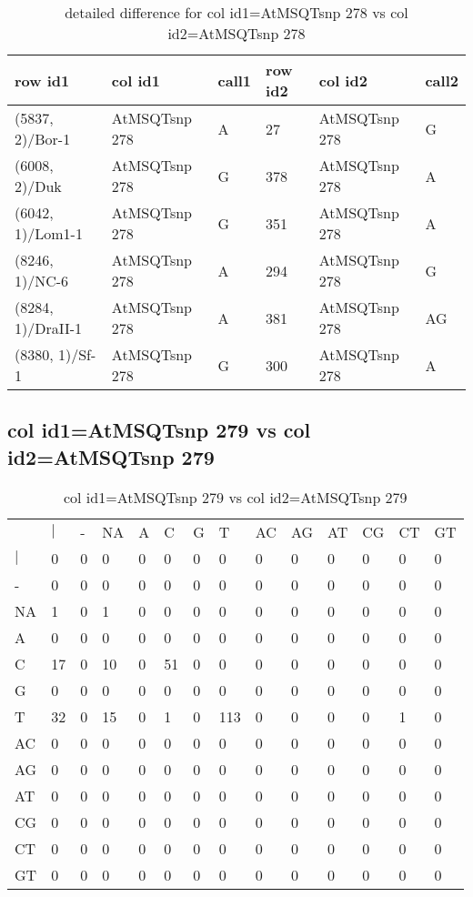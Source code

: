 \begin{center}
\begin{longtable}{|l|l|l|l|l|l|}
\caption{detailed difference for col id1=AtMSQTsnp 278 vs col id2=AtMSQTsnp 278} \label{table_dm617}\\
\hline
row id1&col id1&call1&row id2&col id2&call2\\
\hline
(5837, 2)/Bor-1&AtMSQTsnp 278&A&27&AtMSQTsnp 278&G\\
(6008, 2)/Duk&AtMSQTsnp 278&G&378&AtMSQTsnp 278&A\\
(6042, 1)/Lom1-1&AtMSQTsnp 278&G&351&AtMSQTsnp 278&A\\
(8246, 1)/NC-6&AtMSQTsnp 278&A&294&AtMSQTsnp 278&G\\
(8284, 1)/DraII-1&AtMSQTsnp 278&A&381&AtMSQTsnp 278&AG\\
(8380, 1)/Sf-1&AtMSQTsnp 278&G&300&AtMSQTsnp 278&A\\
\hline
\end{longtable}
\end{center}

\subsection{col id1=AtMSQTsnp 279 vs col id2=AtMSQTsnp 279}
\begin{center}
\begin{longtable}{|l|l|l|l|l|l|l|l|l|l|l|l|l|l|}
\caption{col id1=AtMSQTsnp 279 vs col id2=AtMSQTsnp 279} \label{table_dm618}\\
\hline
\\
\hline
&$|$&-&NA&A&C&G&T&AC&AG&AT&CG&CT&GT\\
$|$&0&0&0&0&0&0&0&0&0&0&0&0&0\\
-&0&0&0&0&0&0&0&0&0&0&0&0&0\\
NA&1&0&1&0&0&0&0&0&0&0&0&0&0\\
A&0&0&0&0&0&0&0&0&0&0&0&0&0\\
C&17&0&10&0&51&0&0&0&0&0&0&0&0\\
G&0&0&0&0&0&0&0&0&0&0&0&0&0\\
T&32&0&15&0&1&0&113&0&0&0&0&1&0\\
AC&0&0&0&0&0&0&0&0&0&0&0&0&0\\
AG&0&0&0&0&0&0&0&0&0&0&0&0&0\\
AT&0&0&0&0&0&0&0&0&0&0&0&0&0\\
CG&0&0&0&0&0&0&0&0&0&0&0&0&0\\
CT&0&0&0&0&0&0&0&0&0&0&0&0&0\\
GT&0&0&0&0&0&0&0&0&0&0&0&0&0\\
\hline
\end{longtable}
\end{center}


